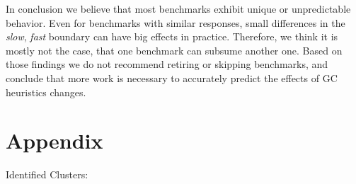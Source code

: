 \documentclass[12pt]{article}
\begin{document}
In conclusion we believe that most benchmarks exhibit unique or unpredictable behavior.
Even for benchmarks with similar responses, small differences in the \emph{slow}, \emph{fast} boundary can have big effects in practice.
Therefore, we think it is mostly not the case, that one benchmark can subsume another one.
Based on those findings we do not recommend retiring or skipping benchmarks, and conclude that more work is necessary to accurately predict the effects of GC heuristics changes.



\section{Appendix}

Identified Clusters:
\end{document}
